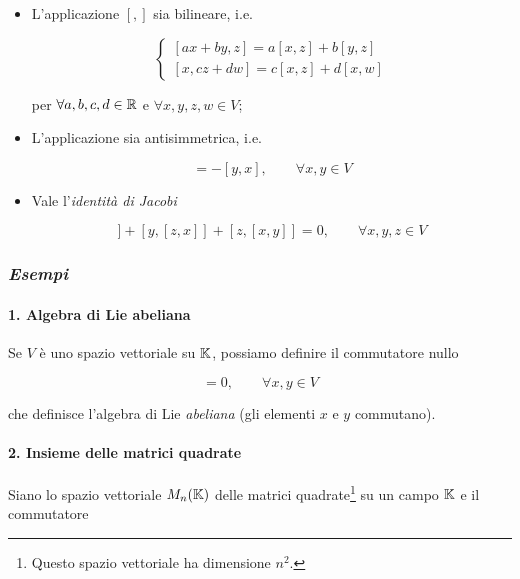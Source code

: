 \begin{itemize}
	\item L'applicazione $ [,] $ sia bilineare, i.e.
	
	\begin{equation}
		\begin{cases}
			[ax+by,z] = a[x,z] + b[y,z]\\
			[x,cz+dw] = c[x,z] + d[x,w]
		\end{cases}
	\end{equation}

	per $ \forall a,b,c,d \in \mathbb{R} $ e $ \forall x,y,z,w \in V $;
	
	\item L'applicazione sia antisimmetrica, i.e.
	
	\begin{equation}
		[x,y] = -[y,x], \qquad \forall x,y \in V
	\end{equation}

	\item Vale l'\textit{identità di Jacobi}
	
	\begin{equation}
		[x,[y,z]] + [y,[z,x]] + [z,[x,y]] = 0, \qquad \forall x,y,z \in V
	\end{equation}
\end{itemize}

\subsubsection{\textit{Esempi}}

\paragraph{1. Algebra di Lie abeliana}

Se $ V $ è uno spazio vettoriale su $ \mathbb{K} $, possiamo definire il commutatore nullo

\begin{equation}
	[x,y] = 0, \qquad \forall x,y \in V
\end{equation}

che definisce l'algebra di Lie \textit{abeliana} (gli elementi $ x $ e $ y $ commutano).

\paragraph{2. Insieme delle matrici quadrate}

Siano lo spazio vettoriale $ M_{n}(\mathbb{K}) $ delle matrici quadrate\footnote{%
	Questo spazio vettoriale ha dimensione $ n^{2} $.%
} su un campo $ \mathbb{K} $ e il commutatore

